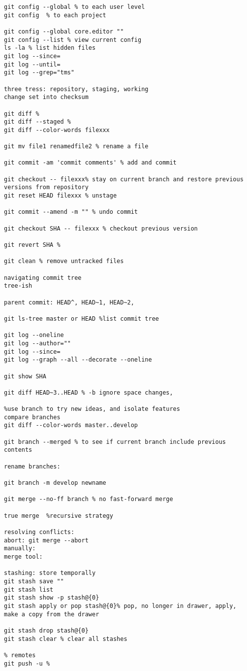 \documentclass[12pt,letterpaper]{article}
\begin{document}
\begin{lstlisting}
git config --global % to each user level
git config  % to each project

git config --global core.editor ""
git config --list % view current config
ls -la % list hidden files
git log --since=
git log --until=
git log --grep="tms"

three tress: repository, staging, working
change set into checksum

git diff %
git diff --staged %
git diff --color-words filexxx

git mv file1 renamedfile2 % rename a file

git commit -am 'commit comments' % add and commit

git checkout -- filexxx% stay on current branch and restore previous versions from repository
git reset HEAD filexxx % unstage

git commit --amend -m "" % undo commit

git checkout SHA -- filexxx % checkout previous version

git revert SHA %

git clean % remove untracked files 

navigating commit tree
tree-ish 

parent commit: HEAD^, HEAD~1, HEAD~2,

git ls-tree master or HEAD %list commit tree 

git log --oneline 
git log --author=""
git log --since=
git log --graph --all --decorate --oneline

git show SHA 

git diff HEAD~3..HEAD % -b ignore space changes, 

%use branch to try new ideas, and isolate features
compare branches
git diff --color-words master..develop  

git branch --merged % to see if current branch include previous contents 

rename branches: 

git branch -m develop newname 

git merge --no-ff branch % no fast-forward merge

true merge  %recursive strategy

resolving conflicts: 
abort: git merge --abort
manually: 
merge tool: 

stashing: store temporally 
git stash save ""
git stash list 
git stash show -p stash@{0}
git stash apply or pop stash@{0}% pop, no longer in drawer, apply, make a copy from the drawer

git stash drop stash@{0} 
git stash clear % clear all stashes

% remotes 
git push -u % 


\end{lstlisting}
\end{document}
